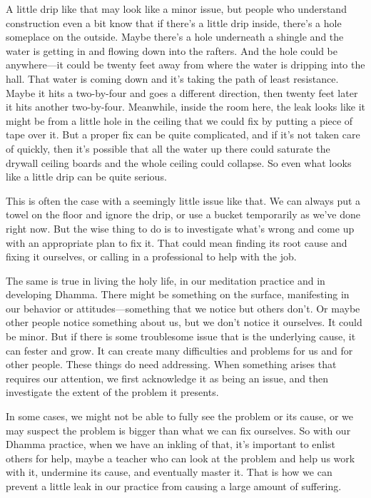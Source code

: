 A little drip like that may look like a minor issue, but people who 
understand construction even a bit know that if there's a little drip 
inside, there's a hole someplace on the outside. Maybe there's a hole 
underneath a shingle and the water is getting in and flowing down into 
the rafters. And the hole could be anywhere---it could be twenty feet 
away from where the water is dripping into the hall. That water is 
coming down and it's taking the path of least resistance. Maybe it hits 
a two-by-four and goes a different direction, then twenty feet later it 
hits another two-by-four. Meanwhile, inside the room here, the leak 
looks like it might be from a little hole in the ceiling that we could 
fix by putting a piece of tape over it. But a proper fix can be quite 
complicated, and if it's not taken care of quickly, then it's possible 
that all the water up there could saturate the drywall ceiling boards 
and the whole ceiling could collapse. So even what looks like a little 
drip can be quite serious.

This is often the case with a seemingly little issue like that. We can 
always put a towel on the floor and ignore the drip, or use a bucket 
temporarily as we've done right now. But the wise thing to do is to 
investigate what's wrong and come up with an appropriate plan to fix 
it. That could mean finding its root cause and fixing it ourselves, or 
calling in a professional to help with the job.

The same is true in living the holy life, in our meditation practice 
and in developing Dhamma. There might be something on the surface, 
manifesting in our behavior or attitudes---something that we notice but 
others don't. Or maybe other people notice something about us, but we 
don't notice it ourselves. It could be minor. But if there is some 
troublesome issue that is the underlying cause, it can fester and grow. 
It can create many difficulties and problems for us and for other 
people. These things do need addressing. When something arises that 
requires our attention, we first acknowledge it as being an issue, and 
then investigate the extent of the problem it presents.

In some cases, we might not be able to fully see the problem or its 
cause, or we may suspect the problem is bigger than what we can fix 
ourselves. So with our Dhamma practice, when we have an inkling of 
that, it's important to enlist others for help, maybe a teacher who can 
look at the problem and help us work with it, undermine its cause, and 
eventually master it. That is how we can prevent a little leak in our 
practice from causing a large amount of suffering.

